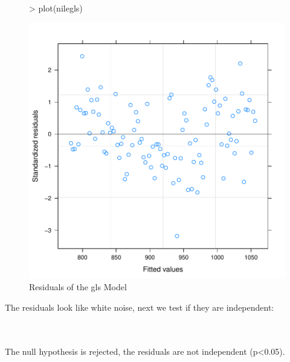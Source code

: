 \documentclass[10pt, a4paper]{article} %
\begin{document}
\begin{figure}[h]
\centering
\begin{Schunk}
\begin{Sinput}
> plot(nilegls)
\end{Sinput}
\end{Schunk}
\includegraphics{FINAL_VERSION-091}
\caption{Residuals of the gls Model}
\end{figure}

\noindent The residuals look like white noise, next we test if they are independent:\\
\\
\begin{Schunk}
\end{Schunk}
\\
\noindent The null hypothesis is rejected, the residuals are not independent
(p<0.05).

% 
% 
% 
\end{document}
